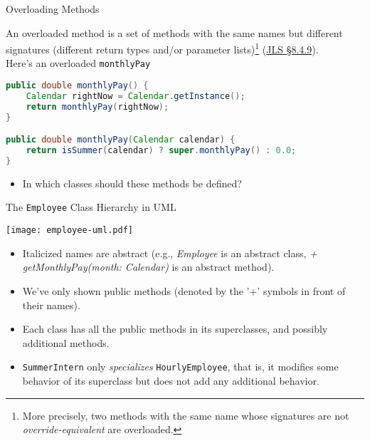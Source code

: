 \documentclass{beamer}
\begin{document}
\begin{frame}[fragile]{Overloading Methods}


An overloaded method is a set of methods with the same names but different signatures (different return types and/or parameter lists)\footnote{More precisely, two methods with the same name whose signatures are not {\it override-equivalent} are overloaded.} (\href{http://docs.oracle.com/javase/specs/jls/se7/html/jls-8.html#jls-8.4.9}{JLS \S 8.4.9}).\\
\vspace{.1in}
Here's an overloaded {\tt monthlyPay}
\begin{lstlisting}[language=Java]
public double monthlyPay() {
    Calendar rightNow = Calendar.getInstance();
    return monthlyPay(rightNow);
}

public double monthlyPay(Calendar calendar) {
    return isSummer(calendar) ? super.monthlyPay() : 0.0;
}
\end{lstlisting}

\begin{itemize}
\item In which classes should these methods be defined?
\end{itemize}


\end{frame}

\begin{frame}[fragile]{The {\tt Employee} Class Hierarchy in UML}


\vspace{-.2in}
\begin{center}
\texttt{[image: employee-uml.pdf]}
\end{center}
\vspace{-.25in}
\begin{itemize}
\item Italicized names are abstract (e.g., {\it Employee} is an abstract class, {\it + getMonthlyPay(month: Calendar)} is an abstract method).
\item We've only shown public methods (denoted by the '+' symbols in front of their names).
\item Each class has all the public methods in its superclasses, and possibly additional methods.
\item {\tt SummerIntern} only {\it specializes} {\tt HourlyEmployee}, that is, it modifies some behavior of its superclass but does not add any additional behavior. 
\end{itemize}


\end{frame}
\end{document}
